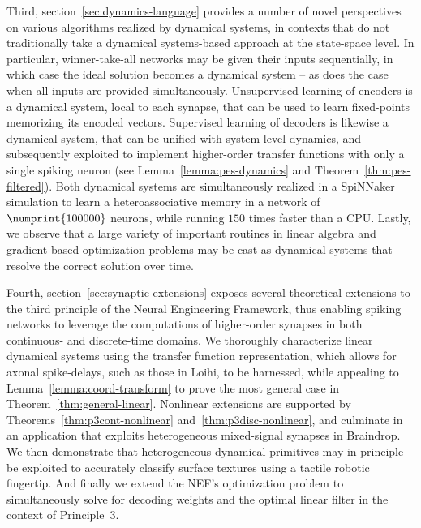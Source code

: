 Third, section~\ref{sec:dynamics-language} provides a number of novel perspectives on various algorithms realized by dynamical systems, in contexts that do not traditionally take a dynamical systems-based approach at the state-space level.
In particular, winner-take-all networks may be given their inputs sequentially, in which case the ideal solution becomes a dynamical system -- as does the case when all inputs are provided simultaneously.
Unsupervised learning of encoders is a dynamical system, local to each synapse, that can be used to learn fixed-points memorizing its encoded vectors. 
Supervised learning of decoders is likewise a dynamical system, that can be unified with system-level dynamics, and subsequently exploited to implement higher-order transfer functions with only a single spiking neuron (see Lemma~\ref{lemma:pes-dynamics} and Theorem~\ref{thm:pes-filtered}).
Both dynamical systems are simultaneously realized in a SpiNNaker simulation to learn a heteroassociative memory in a network of $\numprint{100000}$ neurons, while running $150$ times faster than a CPU.
Lastly, we observe that a large variety of important routines in linear algebra and gradient-based optimization problems may be cast as dynamical systems that resolve the correct solution over time.

Fourth, section~\ref{sec:synaptic-extensions} exposes several theoretical extensions to the third principle of the Neural Engineering Framework, thus enabling spiking networks to leverage the computations of higher-order synapses in both continuous- and discrete-time domains.
We thoroughly characterize linear dynamical systems using the transfer function representation, which allows for axonal spike-delays, such as those in Loihi, to be harnessed, while appealing to Lemma~\ref{lemma:coord-transform} to prove the most general case in Theorem~\ref{thm:general-linear}.
Nonlinear extensions are supported by Theorems~\ref{thm:p3cont-nonlinear} and~\ref{thm:p3disc-nonlinear}, and culminate in an application that exploits heterogeneous mixed-signal synapses in Braindrop.
We then demonstrate that heterogeneous dynamical primitives may in principle be exploited to accurately classify surface textures using a tactile robotic fingertip.
And finally we extend the NEF's optimization problem to simultaneously solve for decoding weights and the optimal linear filter in the context of Principle~3.


